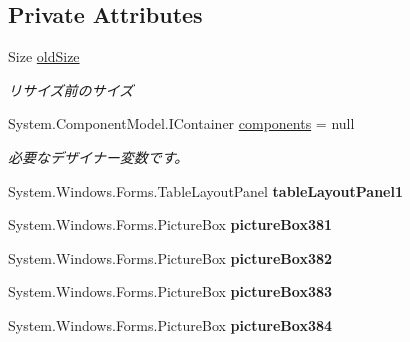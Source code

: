 \subsection*{Private Attributes}
\begin{DoxyCompactItemize}
\item 
\mbox{\label{class_reversi4color_form_1_1_reversi_a2cb7872bfa8099a958c4b0442c58870c}} 
Size \hyperlink{class_reversi4color_form_1_1_reversi_a2cb7872bfa8099a958c4b0442c58870c}{old\+Size}
\begin{DoxyCompactList}\small\item\em リサイズ前のサイズ \end{DoxyCompactList}\item 
System.\+Component\+Model.\+I\+Container \hyperlink{class_reversi4color_form_1_1_reversi_aaf7b7fe6d6a976a0e1465cf6a60e7f7d}{components} = null
\begin{DoxyCompactList}\small\item\em 必要なデザイナー変数です。 \end{DoxyCompactList}\item 
\mbox{\label{class_reversi4color_form_1_1_reversi_a7bc09c1323a35b04bdc1237345336053}} 
System.\+Windows.\+Forms.\+Table\+Layout\+Panel {\bfseries table\+Layout\+Panel1}
\item 
\mbox{\label{class_reversi4color_form_1_1_reversi_a180b71b6dcbaab410c13c6b106844c5b}} 
System.\+Windows.\+Forms.\+Picture\+Box {\bfseries picture\+Box381}
\item 
\mbox{\label{class_reversi4color_form_1_1_reversi_a72772c044e184bc0b2f65f5364ab4677}} 
System.\+Windows.\+Forms.\+Picture\+Box {\bfseries picture\+Box382}
\item 
\mbox{\label{class_reversi4color_form_1_1_reversi_aee558a3af72eaa080d5e24a17c8d72c8}} 
System.\+Windows.\+Forms.\+Picture\+Box {\bfseries picture\+Box383}
\item 
\mbox{\label{class_reversi4color_form_1_1_reversi_ad34f79700724b43dd8e8a4746ec38970}} 
System.\+Windows.\+Forms.\+Picture\+Box {\bfseries picture\+Box384}

\end{DoxyCompactItemize}
